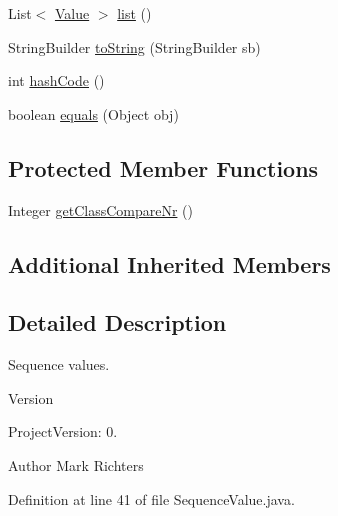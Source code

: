 \begin{DoxyCompactItemize}
\item 
List$<$ \hyperlink{classorg_1_1tzi_1_1use_1_1uml_1_1ocl_1_1value_1_1_value}{Value} $>$ \hyperlink{classorg_1_1tzi_1_1use_1_1uml_1_1ocl_1_1value_1_1_sequence_value_a0c0a9cd99b7c05137f9eb70477ac7e71}{list} ()
\item 
String\-Builder \hyperlink{classorg_1_1tzi_1_1use_1_1uml_1_1ocl_1_1value_1_1_sequence_value_ac78046ac7edbe50cb9a93ce828b9a042}{to\-String} (String\-Builder sb)
\item 
int \hyperlink{classorg_1_1tzi_1_1use_1_1uml_1_1ocl_1_1value_1_1_sequence_value_a9e7de197b9ecd2255413858e8be13ff2}{hash\-Code} ()
\item 
boolean \hyperlink{classorg_1_1tzi_1_1use_1_1uml_1_1ocl_1_1value_1_1_sequence_value_a711a0a87429936f227755a5a8182ee15}{equals} (Object obj)
\end{DoxyCompactItemize}
\subsection*{Protected Member Functions}
\begin{DoxyCompactItemize}
\item 
Integer \hyperlink{classorg_1_1tzi_1_1use_1_1uml_1_1ocl_1_1value_1_1_sequence_value_a3028b10b29ee9f3319e239d71ab248c0}{get\-Class\-Compare\-Nr} ()
\end{DoxyCompactItemize}
\subsection*{Additional Inherited Members}


\subsection{Detailed Description}
Sequence values.

\begin{DoxyVersion}{Version}

\end{DoxyVersion}
\begin{DoxyParagraph}{Project\-Version\-:}
0. 
\end{DoxyParagraph}
\begin{DoxyAuthor}{Author}
Mark Richters 
\end{DoxyAuthor}


Definition at line 41 of file Sequence\-Value.\-java.



